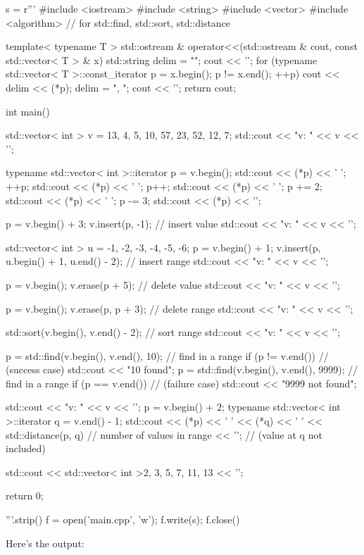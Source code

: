 \begin{python}
s = r'''
#include <iostream>
#include <string>
#include <vector>
#include <algorithm> // for std::find, std::sort, std::distance

template< typename T >
std::ostream & operator<<(std::ostream & cout,
                          const std::vector< T > & x)
{
    std::string delim = "";
    cout << '{';
    for (typename std::vector< T >::const_iterator p = x.begin();
         p != x.end(); ++p)
    {
        cout << delim << (*p);
        delim = ", ";
    }
    cout << '}';
    return cout;
}

int main()
{
    std::vector< int > v = {13, 4, 5, 10, 57, 23, 52, 12, 7};
    std::cout << "v: " << v << '\n';
    
    typename std::vector< int >::iterator p = v.begin();
    std::cout << (*p) << ' ';
    ++p;
    std::cout << (*p) << ' ';
    p++;
    std::cout << (*p) << ' ';
    p += 2;
    std::cout << (*p) << ' ';
    p -= 3;
    std::cout << (*p) << '\n';

    p = v.begin() + 3;
    v.insert(p, -1);                          // insert value
    std::cout << "v: " << v << '\n';

    std::vector< int > u = {-1, -2, -3, -4, -5, -6};
    p = v.begin() + 1;
    v.insert(p, u.begin() + 1, u.end() - 2);  // insert range 
    std::cout << "v: " << v << '\n';

    p = v.begin();
    v.erase(p + 5);                           // delete value
    std::cout << "v: " << v << '\n';
    
    p = v.begin();
    v.erase(p, p + 3);                        // delete range
    std::cout << "v: " << v << '\n';

    std::sort(v.begin(), v.end() - 2);        // sort range
    std::cout << "v: " << v << '\n';

    p = std::find(v.begin(), v.end(), 10);    // find in a range
    if (p != v.end())                         // (success case)
    {
        std::cout << "10 found\n";
    }
    p = std::find(v.begin(), v.end(), 9999);  // find in a range
    if (p == v.end())                         // (failure case)
    {
        std::cout << "9999 not found\n";
    }

    std::cout << "v: " << v << '\n';
    p = v.begin() + 2;
    typename std::vector< int >::iterator q = v.end() - 1;
    std::cout << (*p) << ' ' << (*q) << ' '
              << std::distance(p, q) // number of values in range
              << '\n';               // (value at q not included)
    
    std::cout << std::vector< int >{2, 3, 5, 7, 11, 13} << '\n';
    
    return 0;
}
'''.strip()
f = open('main.cpp', 'w'); f.write(s); f.close()
\end{python}
Here's the output:

